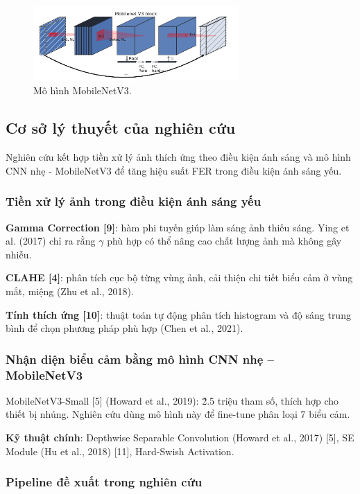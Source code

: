 \begin{figure}[H]
    \centering
    \includegraphics[width=0.7\textwidth]{img/mobinetv3.png} %
    \caption{Mô hình MobileNetV3.}
    \label{fig:emotion_distribution}
\end{figure}


\subsection{Cơ sở lý thuyết của nghiên cứu}
Nghiên cứu kết hợp tiền xử lý ảnh thích ứng theo điều kiện ánh sáng và mô hình CNN nhẹ - MobileNetV3 để tăng hiệu suất FER trong điều kiện ánh sáng yếu.

\subsubsection{Tiền xử lý ảnh trong điều kiện ánh sáng yếu}
\textbf{Gamma Correction [9]}: hàm phi tuyến giúp làm sáng ảnh thiếu sáng. Ying et al. (2017) chỉ ra rằng \(\gamma\) phù hợp có thể nâng cao chất lượng ảnh mà không gây nhiễu.\par
\textbf{CLAHE [4]}: phân tích cục bộ từng vùng ảnh, cải thiện chi tiết biểu cảm ở vùng mắt, miệng (Zhu et al., 2018).\par
\textbf{Tính thích ứng [10]}: thuật toán tự động phân tích histogram và độ sáng trung bình để chọn phương pháp phù hợp (Chen et al., 2021).

\subsubsection{Nhận diện biểu cảm bằng mô hình CNN nhẹ – MobileNetV3}
MobileNetV3-Small [5] (Howard et al., 2019): \~2.5 triệu tham số, thích hợp cho thiết bị nhúng. Nghiên cứu dùng mô hình này để fine-tune phân loại 7 biểu cảm.\par
\textbf{Kỹ thuật chính}: Depthwise Separable Convolution (Howard et al., 2017) [5], SE Module (Hu et al., 2018) [11], Hard-Swish Activation.

\subsubsection{Pipeline đề xuất trong nghiên cứu}


